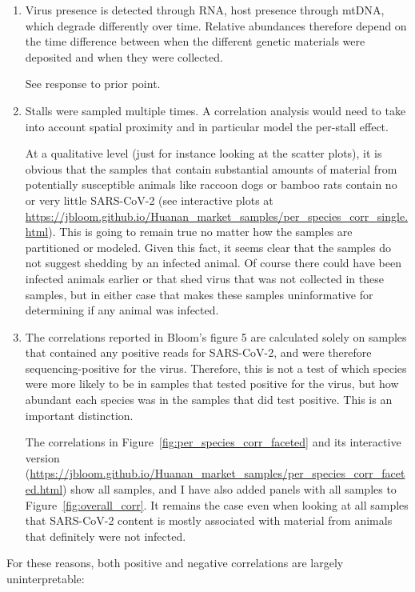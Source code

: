 \documentclass[9pt,twocolumn,twoside]{gsajnl_modified}
\begin{document}
\begin{enumerate}
\begin{enumerate}[label=\alph*)]
\item Virus presence is detected through RNA, host presence through mtDNA, which degrade differently over time. Relative abundances therefore depend on the time difference between when the different genetic materials were deposited and when they were collected.

{\color{black}
See response to prior point.
}

\item Stalls were sampled multiple times. A correlation analysis would need to take into account spatial proximity and in particular model the per-stall effect.

{\color{black}
At a qualitative level (just for instance looking at the scatter plots), it is obvious that the samples that contain substantial amounts of material from potentially susceptible animals like raccoon dogs or bamboo rats contain no or very little SARS-CoV-2 (see interactive plots at \url{https://jbloom.github.io/Huanan_market_samples/per_species_corr_single.html}).
This is going to remain true no matter how the samples are partitioned or modeled.
Given this fact, it seems clear that the samples do not suggest shedding by an infected animal. 
Of course there could have been infected animals earlier or that shed virus that was not collected in these samples, but in either case that makes these samples uninformative for determining if any animal was infected.
}

\item The correlations reported in Bloom’s figure 5 are calculated solely on samples that contained any positive reads for SARS-CoV-2, and were therefore sequencing-positive for the virus. Therefore, this is not a test of which species were more likely to be in samples that tested positive for the virus, but how abundant each species was in the samples that did test positive. This is an important distinction.

{\color{black}
The correlations in Figure~\ref{fig:per_species_corr_faceted} and its interactive version (\url{https://jbloom.github.io/Huanan_market_samples/per_species_corr_faceted.html}) show all samples, and I have also added panels with all samples to Figure~\ref{fig:overall_corr}.
It remains the case even when looking at all samples that SARS-CoV-2 content is mostly associated with material from animals that definitely were not infected.
}

\end{enumerate}

For these reasons, both positive and negative correlations are largely uninterpretable:
\begin{itemize}


\end{itemize}
\end{enumerate}
\end{document}
